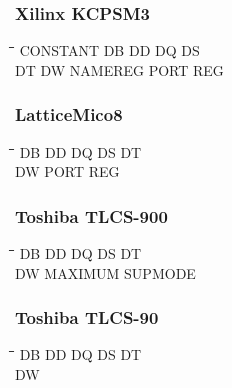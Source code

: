 \subsubsection{Xilinx KCPSM3}
{\tt\begin{tabbing}
\hspace{3cm}\=\hspace{3cm}\=\hspace{3cm}\=\hspace{3cm}\=\kill
CONSTANT   \> DB         \> DD          \> DQ          \> DS \\
DT         \> DW         \> NAMEREG     \> PORT        \> REG \\
\end{tabbing}}

\subsubsection{LatticeMico8}
{\tt\begin{tabbing}
\hspace{3cm}\=\hspace{3cm}\=\hspace{3cm}\=\hspace{3cm}\=\kill
DB         \> DD          \> DQ          \> DS         \> DT \\
DW         \> PORT        \> REG \\
\end{tabbing}}

\subsubsection{Toshiba TLCS-900}
{\tt\begin{tabbing}
\hspace{3cm}\=\hspace{3cm}\=\hspace{3cm}\=\hspace{3cm}\=\kill
DB         \> DD          \> DQ          \> DS          \> DT \\
DW         \> MAXIMUM     \> SUPMODE \\
\end{tabbing}}

\subsubsection{Toshiba TLCS-90}
{\tt\begin{tabbing}
\hspace{3cm}\=\hspace{3cm}\=\hspace{3cm}\=\hspace{3cm}\=\kill
DB         \> DD          \> DQ          \> DS          \> DT \\
DW \\
\end{tabbing}}

